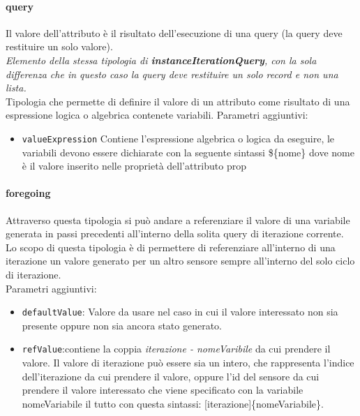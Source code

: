 \documentclass[12pt,a4paper,italian]{article}
\begin{document}
{{\paragraph{\large{query}} Il valore dell'attributo è il risultato dell'esecuzione di una query (la query deve restituire un solo valore).\\
\newline
\emph{Elemento della stessa tipologia di \textbf{instanceIterationQuery}, con la sola differenza che in questo caso la query deve restituire un solo record e non una lista.}\\
 Tipologia che permette di definire il valore di un attributo come risultato di una espressione logica o algebrica contenete variabili.
Parametri aggiuntivi:
\begin{itemize}
	\item \texttt{valueExpression} Contiene l'espressione algebrica o logica da eseguire, le variabili devono essere dichiarate con la seguente sintassi \$\{nome\} dove nome è il valore inserito nelle proprietà dell'attributo prop
\end{itemize}
\paragraph{\large{foregoing}} Attraverso questa tipologia si può andare a referenziare il valore di una variabile generata in passi precedenti all'interno della solita query di iterazione corrente.\\
Lo scopo di questa tipologia è di permettere di referenziare all'interno di una iterazione un valore generato per un altro sensore sempre all'interno del solo ciclo di iterazione.\\
Parametri aggiuntivi:
\begin{itemize}
	\item \texttt{defaultValue}: Valore da usare nel caso in cui il valore interessato non sia presente oppure non sia ancora stato generato.
	\item \texttt{refValue}:contiene la coppia \emph{iterazione - nomeVaribile} da cui prendere il valore. Il valore di iterazione può essere sia un intero, che rappresenta l'indice dell'iterazione 
	da cui prendere il valore, oppure l'id del sensore da cui prendere il valore interessato che viene specificato con la variabile nomeVariabile il tutto con questa sintassi: \@[iterazione]\{nomeVariabile\}.
\end{itemize}
}}
\end{document}
